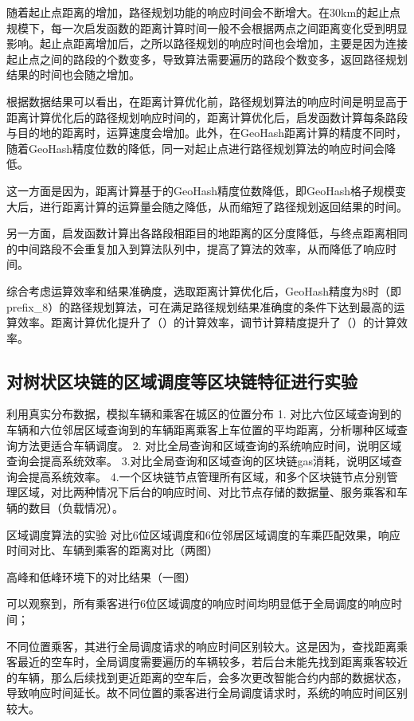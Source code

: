   随着起止点距离的增加，路径规划功能的响应时间会不断增大。在30km的起止点规模下，每一次启发函数的距离计算时间一般不会根据两点之间距离变化受到明显影响。起止点距离增加后，之所以路径规划的响应时间也会增加，主要是因为连接起止点之间的路段的个数变多，导致算法需要遍历的路段个数变多，返回路径规划结果的时间也会随之增加。

  根据数据结果可以看出，在距离计算优化前，路径规划算法的响应时间是明显高于距离计算优化后的路径规划响应时间的，距离计算优化后，启发函数计算每条路段与目的地的距离时，运算速度会增加。此外，在GeoHash距离计算的精度不同时，随着GeoHash精度位数的降低，同一对起止点进行路径规划算法的响应时间会降低。

  这一方面是因为，距离计算基于的GeoHash精度位数降低，即GeoHash格子规模变大后，进行距离计算的运算量会随之降低，从而缩短了路径规划返回结果的时间。

  另一方面，启发函数计算出各路段相距目的地距离的区分度降低，与终点距离相同的中间路段不会重复加入到算法队列中，提高了算法的效率，从而降低了响应时间。

  综合考虑运算效率和结果准确度，选取距离计算优化后，GeoHash精度为8时（即prefix_8）的路径规划算法，可在满足路径规划结果准确度的条件下达到最高的运算效率。距离计算优化提升了（）的计算效率，调节计算精度提升了（）的计算效率。



\subsection{对树状区块链的区域调度等区块链特征进行实验}

利用真实分布数据，模拟车辆和乘客在城区的位置分布
1. 对比六位区域查询到的车辆和六位邻居区域查询到的车辆距离乘客上车位置的平均距离，分析哪种区域查询方法更适合车辆调度。
2. 对比全局查询和区域查询的系统响应时间，说明区域查询会提高系统效率。
3.对比全局查询和区域查询的区块链gas消耗，说明区域查询会提高系统效率。
4.一个区块链节点管理所有区域，和多个区块链节点分别管理区域，对比两种情况下后台的响应时间、对比节点存储的数据量、服务乘客和车辆的数目（负载情况）。


区域调度算法的实验
  对比6位区域调度和6位邻居区域调度的车乘匹配效果，响应时间对比、车辆到乘客的距离对比（两图）
  

  高峰和低峰环境下的对比结果（一图）

  可以观察到，所有乘客进行6位区域调度的响应时间均明显低于全局调度的响应时间；

  不同位置乘客，其进行全局调度请求的响应时间区别较大。这是因为，查找距离乘客最近的空车时，全局调度需要遍历的车辆较多，若后台未能先找到距离乘客较近的车辆，那么后续找到更近距离的空车后，会多次更改智能合约内部的数据状态，导致响应时间延长。故不同位置的乘客进行全局调度请求时，系统的响应时间区别较大。

